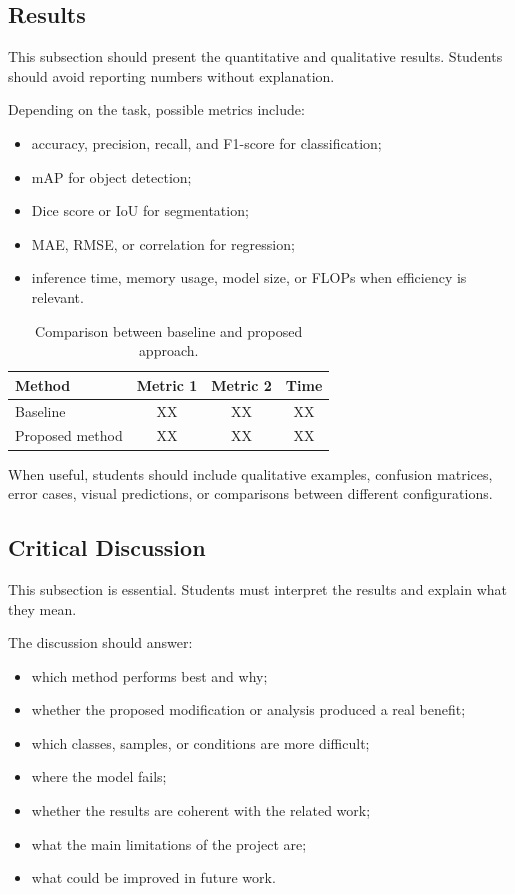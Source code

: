 \documentclass[10pt,twocolumn,a4paper]{article}
\begin{document}
 \subsection{Results}
 
 This subsection should present the quantitative and qualitative results. Students should avoid reporting numbers without explanation.
 
 Depending on the task, possible metrics include:
 \begin{itemize}
  \item accuracy, precision, recall, and F1-score for classification;
  \item mAP for object detection;
  \item Dice score or IoU for segmentation;
  \item MAE, RMSE, or correlation for regression;
  \item inference time, memory usage, model size, or FLOPs when efficiency is relevant.
 \end{itemize}
 
 \begin{table}[h]
  \centering
  \caption{Comparison between baseline and proposed approach.}
  \label{tab:results}
  \begin{tabular}{|l|c|c|c|}
   \hline
   \textbf{Method} & \textbf{Metric 1} & \textbf{Metric 2} & \textbf{Time} \\
   \hline
   Baseline & XX & XX & XX \\
   Proposed method & XX & XX & XX \\
   \hline
  \end{tabular}
 \end{table}
 
 When useful, students should include qualitative examples, confusion matrices, error cases, visual predictions, or comparisons between different configurations.
 
 \subsection{Critical Discussion}
 
 This subsection is essential. Students must interpret the results and explain what they mean.
 
 The discussion should answer:
 \begin{itemize}
  \item which method performs best and why;
  \item whether the proposed modification or analysis produced a real benefit;
  \item which classes, samples, or conditions are more difficult;
  \item where the model fails;
  \item whether the results are coherent with the related work;
  \item what the main limitations of the project are;
  \item what could be improved in future work.
 \end{itemize}
 
\end{document}

